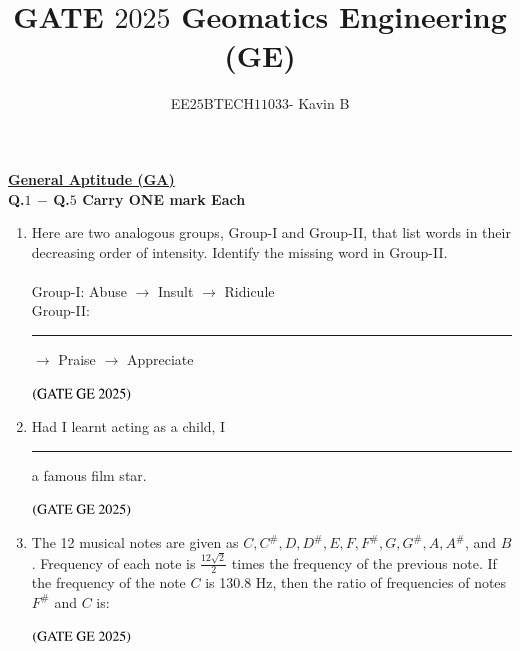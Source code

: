 \documentclass[journal,12pt,onecolumn]{IEEEtran}
\theoremstyle{remark}
\begin{document}
\title{GATE $2025$ Geomatics Engineering (GE)}
\author{EE$25$BTECH$11033$- Kavin B}
\maketitle
\renewcommand{\thefigure}{\theenumi}
\renewcommand{\thetable}{\theenumi}

\underline{\textbf{General Aptitude (GA)}}
\\

\textbf{Q.$1$ $-$ Q.$5$ Carry ONE mark Each}
\vspace{0.5cm}
\begin{enumerate}
\item Here are two analogous groups, Group-I and Group-II, that list words in their decreasing order of intensity. Identify the missing word in Group-II.\\
\\
\noindent Group-I: \quad Abuse $\rightarrow$ Insult $\rightarrow$ Ridicule \\
Group-II: \quad \rule{1.5cm}{0.15mm} $\rightarrow$ Praise $\rightarrow$ Appreciate

\begin{enumerate}
\end{enumerate}
\hfill $\left(\text{GATE GE 2025}\right)$
\bigskip
\item Had I learnt acting as a child, I \rule{2.5cm}{1pt} a famous film star.
\begin{enumerate}
\end{enumerate}
\hfill $\left(\text{GATE GE 2025}\right)$
\bigskip
\item The 12 musical notes are given as $C, C^\#, D, D^\#, E, F, F^\#, G, G^\#, A, A^\#$, and $B$. Frequency of each note is $\frac{12\sqrt{2}}{2}$ times the frequency of the previous note. If the frequency of the note $C$ is 130.8 Hz, then the ratio of frequencies of notes $F^\#$ and $C$ is:
\begin{enumerate}
\end{enumerate}
\hfill $\left(\text{GATE GE 2025}\right)$
\bigskip


\end{enumerate}
\end{document}
